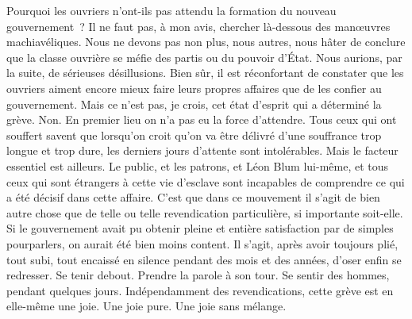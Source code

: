 \documentclass[french,twoside]{book} %
\begin{document}
Pourquoi les ouvriers n'ont-ils pas attendu la formation du nouveau gouvernement ? Il ne faut pas, à mon avis, chercher là-dessous des manœuvres machiavéliques. Nous ne devons pas non plus, nous autres, nous hâter de conclure que la classe ouvrière se méfie des partis ou du pouvoir d'État. Nous aurions, par la suite, de sérieuses désillusions. Bien sûr, il est réconfortant de constater que les ouvriers aiment encore mieux faire leurs propres affaires que de les confier au gouvernement. Mais ce n'est pas, je crois, cet état d'esprit qui a déterminé la grève. Non. En premier lieu on n'a pas eu la force d'attendre. Tous ceux qui ont souffert savent que lorsqu'on croit qu'on va être délivré d'une souffrance trop longue et trop dure, les derniers jours d'attente sont intolérables. Mais le facteur essentiel est ailleurs. Le public, et les patrons, et Léon Blum lui-même, et tous ceux qui sont étrangers à cette vie d'esclave sont incapables de comprendre ce qui a été décisif dans cette affaire. C'est que dans ce mouvement il s'agit de bien autre chose que de telle ou telle revendication particulière, si importante soit-elle. Si le gouvernement avait pu obtenir pleine et entière satisfaction par de simples pourparlers, on aurait été bien moins content. Il s'agit, après avoir toujours plié, tout subi, tout encaissé en silence pendant des mois et des années, d'oser enfin se redresser. Se tenir debout. Prendre la parole à son tour. Se sentir des hommes, pendant quelques jours. Indépendamment des revendications, cette grève est en elle-même une joie. Une joie pure. Une joie sans mélange.\par
\end{document}
